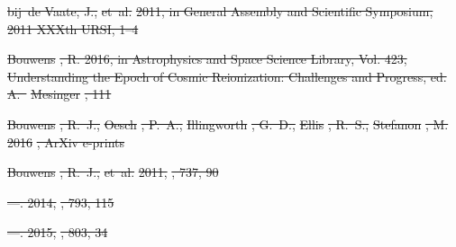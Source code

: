 \documentclass[numberedappendix]{emulateapj}
\providecommand{\DIFdel}[1]{{\protect\color{red}\sout{#1}}}                      %
\begin{document}
\DIFdel{bij~de Vaate, J., }%
\DIFdel{et~al.}%
\DIFdel{2011, in General Assembly and Scientific Symposium,
  2011 XXXth URSI, 1--4
}%

\DIFdel{Bouwens}%
\DIFdel{, R. 2016, in Astrophysics and Space Science Library, Vol. 423,
  Understanding the Epoch of Cosmic Reionization: Challenges and Progress, ed.
  A.~}%
\DIFdel{Mesinger}%
\DIFdel{, 111
}%

\DIFdel{Bouwens}%
\DIFdel{, R.~J., }%
\DIFdel{Oesch}%
\DIFdel{, P.~A., }%
\DIFdel{Illingworth}%
\DIFdel{, G.~D., }%
\DIFdel{Ellis}%
\DIFdel{, R.~S., }%
\DIFdel{Stefanon}%
\DIFdel{, M. 2016}%
\DIFdel{, ArXiv e-prints
}%

\DIFdel{Bouwens}%
\DIFdel{, R.~J., }%
\DIFdel{et~al.}%
\DIFdel{2011, }%
\DIFdel{, 737, 90
}%

\DIFdel{---. 2014, }%
\DIFdel{, 793, 115
}%

\DIFdel{---. 2015, }%
\DIFdel{, 803, 34
}%
\end{document}
